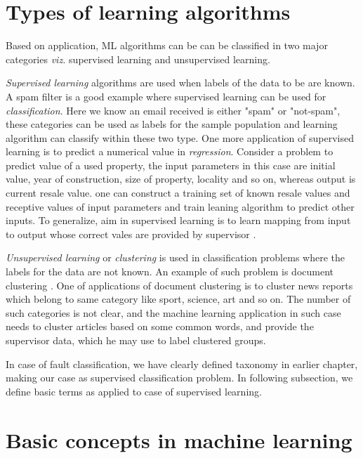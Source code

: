 \section{Types of learning algorithms}
Based on application, ML algorithms can be can be classified in two major categories \emph{viz.} supervised learning and unsupervised learning. 

\emph{Supervised learning} algorithms are used when labels of the data to be are known. A spam filter is a good example where supervised learning can be used for \emph{classification}. Here we know an email received is either "spam" or "not-spam", these categories can be used as labels for the sample population and learning algorithm can classify within these two type.  One more application of supervised learning is to predict a numerical value in \emph{regression}. Consider a problem to predict value of a used property, the input parameters in this case are initial value, year of construction, size of property, locality and so on, whereas output is current resale value. one can construct a training set of known resale values and receptive values of input parameters and train leaning algorithm to predict other inputs. To generalize, aim in supervised learning is to learn mapping from input to output whose correct vales are provided by supervisor \cite{Alpaydin2004}.

\emph{Unsupervised learning} or \emph{clustering} is used in classification problems where the labels for the data are not known. An example of such problem is document clustering \cite{Alpaydin2004}. One of applications of document clustering is to cluster news reports which belong to same category like sport, science, art and so on. The number of such categories is not clear, and the machine learning application in such case needs to cluster articles based on some common words, and provide the supervisor data, which he may use to label clustered groups.

In case of fault classification, we have clearly defined taxonomy in earlier chapter, making our case as supervised classification problem. In following subsection, we define basic terms as applied to case of supervised learning.

\section{Basic concepts in machine learning}

